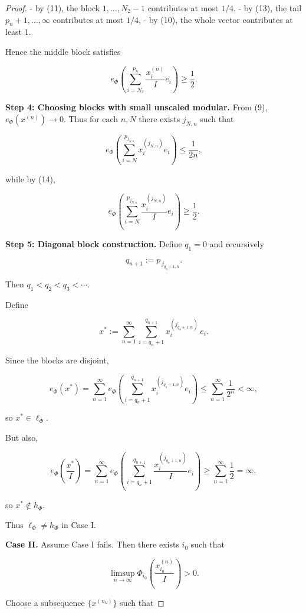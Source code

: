 \documentclass[12pt]{article}
\theoremstyle{thmstyleone}%
\theoremstyle{thmstyletwo}%
\theoremstyle{thmstylethree}%
\begin{document}
{\begin{proof}
{- by (11), the block $1,\dots,N_2-1$ contributes at most $1/4$,
- by (13), the tail $p_n+1,\dots,\infty$ contributes at most $1/4$,
- by (10), the whole vector contributes at least $1$.

Hence the middle block satisfies


\[
e_\Phi\!\left(\sum_{i=N_2}^{p_n} \frac{x^{(n)}_i}{I} e_i\right)
\ge \frac12.
\tag{14}
\]



\medskip
\textbf{Step 4: Choosing blocks with small unscaled modular.}
From (9), $e_\Phi(x^{(n)})\to 0$.  
Thus for each $n,N$ there exists $j_{N,n}$ such that


\[
e_\Phi\!\left(\sum_{i=N}^{p_{j_{N,n}}} x^{(j_{N,n})}_i e_i\right)
\le \frac{1}{2n},
\]


while by (14),


\[
e_\Phi\!\left(\sum_{i=N}^{p_{j_{N,n}}}
\frac{x^{(j_{N,n})}_i}{I} e_i\right)
\ge \frac12.
\tag{15}
\]



\medskip
\textbf{Step 5: Diagonal block construction.}
Define $q_1=0$ and recursively


\[
q_{n+1} := p_{\,j_{q_n+1,n}}.
\]


Then $q_1<q_2<q_3<\cdots$.

Define


\[
x^\ast := 
\sum_{n=1}^\infty 
\sum_{i=q_n+1}^{q_{n+1}}
x^{(j_{q_n+1,n})}_i\, e_i.
\]



Since the blocks are disjoint,


\[
e_\Phi(x^\ast)
= \sum_{n=1}^\infty 
e_\Phi\!\left(\sum_{i=q_n+1}^{q_{n+1}}
x^{(j_{q_n+1,n})}_i e_i\right)
\le \sum_{n=1}^\infty \frac{1}{2^n}
< \infty,
\]


so $x^\ast\in \ell_\Phi$.

But also,


\[
e_\Phi\!\left(\frac{x^\ast}{I}\right)
= \sum_{n=1}^\infty 
e_\Phi\!\left(\sum_{i=q_n+1}^{q_{n+1}}
\frac{x^{(j_{q_n+1,n})}_i}{I} e_i\right)
\ge \sum_{n=1}^\infty \frac12
= \infty,
\]


so $x^\ast\notin h_\Phi$.

Thus $\ell_\Phi\neq h_\Phi$ in Case I.

\bigskip
\noindent
\textbf{Case II.}  
Assume Case I fails.  
Then there exists $i_0$ such that


\[
\limsup_{n\to\infty}
\Phi_{i_0}\!\left(\frac{x^{(n)}_{i_0}}{I}\right) > 0.
\]


Choose a subsequence $\{x^{(n_k)}\}$ such that


}
\end{proof}}
\end{document}
